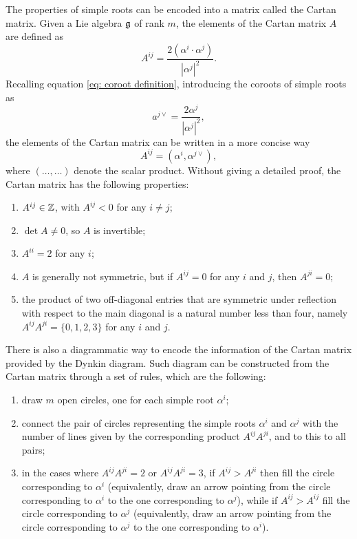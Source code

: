 The properties of simple roots can be encoded into a matrix called the Cartan matrix. Given a Lie algebra $\mathfrak{g}$ of rank $m$, the elements of the Cartan matrix $A$ are defined as
\begin{equation}
    A^{ij} = \frac{2(\alpha^i \cdot \alpha^j)}{|\alpha^j|^2}.
\end{equation}
Recalling equation \eqref{eq: coroot definition}, introducing the coroots of simple roots as
\begin{equation}
    a^{j\vee} = \frac{2\alpha^j}{|\alpha^j|^2},
\end{equation}
the elements of the Cartan matrix can be written in a more concise way
\begin{equation}
    A^{ij} = (\alpha^i,\alpha^{j\vee}),
\end{equation}
where $(\dots,\dots)$ denote the scalar product. Without giving a detailed proof, the Cartan matrix has the following properties:
\begin{enumerate}
    \item $A^{ij} \in \mathbb{Z}$, with $A^{ij} < 0$ for any $i \neq j$;
    \item $\det{A} \neq 0$, so $A$ is invertible;
    \item $A^{ii} = 2$ for any $i$;
    \item $A$ is generally not symmetric, but if $A^{ij} = 0$ for any $i$ and $j$, then $A^{ji} = 0$;
    \item the product of two off-diagonal entries that are symmetric under reflection with respect to the main diagonal is a natural number less than four, namely $A^{ij}A^{ji} = \{0,1,2,3\}$ for any $i$ and $j$.
\end{enumerate}
There is also a diagrammatic way to encode the information of the Cartan matrix provided by the Dynkin diagram. Such diagram can be constructed from the Cartan matrix through a set of rules, which are the following:
\begin{enumerate}
    \item draw $m$ open circles, one for each simple root $\alpha^i$;
    \item connect the pair of circles representing the simple roots $\alpha^i$ and $\alpha^j$ with the number of lines given by the corresponding product $A^{ij}A^{ji}$, and to this to all pairs;
    \item in the cases where $A^{ij}A^{ji} = 2$ or $A^{ij}A^{ji} = 3$, if $A^{ij} > A^{ji}$ then fill the circle corresponding to $\alpha^i$ (equivalently, draw an arrow pointing from the circle corresponding to $\alpha^i$ to the one corresponding to $\alpha^j$), while if $A^{ij} > A^{ij}$ fill the circle corresponding to $\alpha^j$ (equivalently, draw an arrow pointing from the circle corresponding to $\alpha^j$ to the one corresponding to $\alpha^i$).
\end{enumerate}
